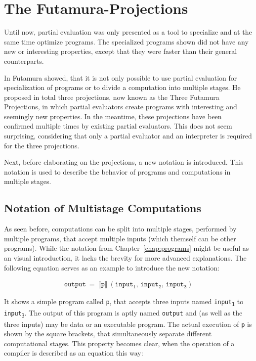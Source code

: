 
\section{The Futamura-Projections}\label{sec:futamura}

Until now, partial evaluation was only presented as a tool to specialize and at the same time optimize programs.
The specialized programs shown did not have any new or interesting properties, except that they were faster than their general counterparts.

In \citationneeded[] Futamura showed, that it is not only possible to use partial evaluation for specialization of programs or to divide a computation into multiple stages.
He proposed in total three projections, now known as the Three Futamura Projections, in which partial evaluators create programs with interesting and seemingly new properties.
In the meantime, these projections have been confirmed multiple times by existing partial evaluators.
This does not seem surprising, considering that only a partial evaluator and an interpreter is required for the three projections.

Next, before elaborating on the projections, a new notation is introduced.
This notation is used to describe the behavior of programs and computations in multiple stages.


\subsection{Notation of Multistage Computations}\label{sec:multistage-notation}

As seen before, computations can be split into multiple stages, performed by multiple programs, that accept multiple inputs (which themself can be other programs).
While the notation from Chapter~\ref{chap:programs} might be useful as an visual introduction, it lacks the brevity for more advanced explanations.
The following equation serves as an example to introduce the new notation:

\begin{align*}
  \mathtt{output}\ =\
  \llbracket \mathtt{p} \rrbracket\ (\mathtt{input_1},\, \mathtt{input_2},\, \mathtt{input_3})
\end{align*}

It shows a simple program called \texttt{p}, that accepts three inputs named \texttt{input\textsubscript{1}} to \texttt{input\textsubscript{3}}.
The output of this program is aptly named \texttt{output} and (as well as the three inputs) may be data or an executable program.
The actual execution of \texttt{p} is shown by the square brackets, that simultaneously separate different computational stages.
This property becomes clear, when the operation of a compiler is described as an equation this way:

